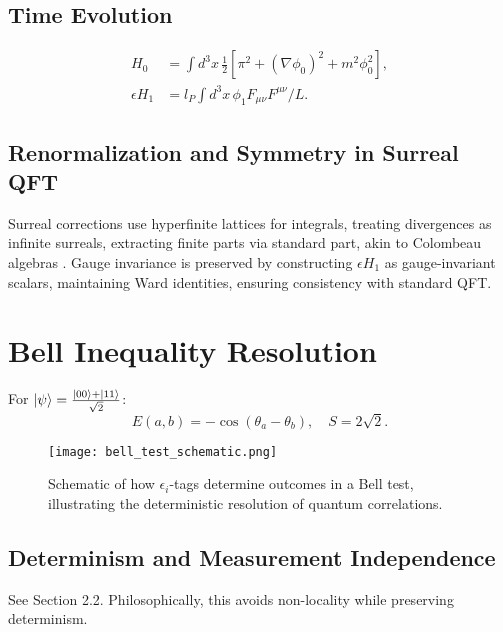 \documentclass{article}
\begin{document}
\subsection{Time Evolution}
\begin{align}
H_0 &= \int d^3x \, \frac{1}{2} [\pi^2 + (\nabla \phi_0)^2 + m^2 \phi_0^2], \\
\epsilon H_1 &= l_P \int d^3x \, \phi_1 F_{\mu\nu} F^{\mu\nu} / L.
\end{align}

\subsection{Renormalization and Symmetry in Surreal QFT}
Surreal corrections use hyperfinite lattices for integrals, treating divergences as infinite surreals, extracting finite parts via standard part, akin to Colombeau algebras \cite{Grosser2001}. Gauge invariance is preserved by constructing \(\epsilon H_1\) as gauge-invariant scalars, maintaining Ward identities, ensuring consistency with standard QFT.

\section{Bell Inequality Resolution}
For \(\ket{\psi} = \frac{\ket{00} + \ket{11}}{\sqrt{2}}\):
\begin{equation}
E(a,b) = -\cos(\theta_a - \theta_b), \quad S = 2\sqrt{2}.
\end{equation}

\begin{figure}[h]
    \centering
    \texttt{[image: bell\_test\_schematic.png]}
    \caption{Schematic of how \(\epsilon_i\)-tags determine outcomes in a Bell test, illustrating the deterministic resolution of quantum correlations.}
    \label{fig:bell_test}
\end{figure}

\subsection{Determinism and Measurement Independence}
See Section 2.2. Philosophically, this avoids non-locality while preserving determinism.
\end{document}
